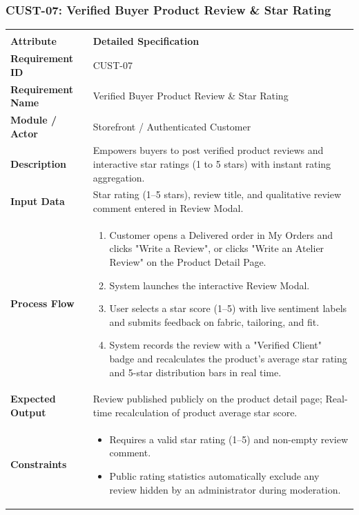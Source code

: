 \documentclass[12pt,a4paper,oneside]{report}
\begin{document}
\subsubsection{CUST-07: Verified Buyer Product Review \& Star Rating}
\begin{longtable}{|p{3.6cm}|p{11.9cm}|}
\hline
\rowcolor{PrimaryBrown}
\multicolumn{2}{|p{15.5cm}|}{\textbf{\textcolor{white}{Functional Specification: CUST-07 -- Verified Buyer Product Review \& Star Rating}}} \\
\hline
\endfirsthead
\hline
\rowcolor{PrimaryBrown}
\multicolumn{2}{|p{15.5cm}|}{\textbf{\textcolor{white}{Functional Specification: CUST-07 (Continued)}}} \\
\hline
\textbf{Attribute} & \textbf{Detailed Specification} \\
\hline
\endhead
\hline
\endfoot
\textbf{Requirement ID} & CUST-07 \\
\hline
\textbf{Requirement Name} & Verified Buyer Product Review \& Star Rating \\
\hline
\textbf{Module / Actor} & Storefront / Authenticated Customer \\
\hline
\textbf{Description} & Empowers buyers to post verified product reviews and interactive star ratings (1 to 5 stars) with instant rating aggregation. \\
\hline
\textbf{Input Data} & Star rating (1--5 stars), review title, and qualitative review comment entered in Review Modal. \\
\hline
\textbf{Process Flow} & \begin{enumerate}[leftmargin=*,nosep,topsep=2pt]
  \item Customer opens a Delivered order in My Orders and clicks "Write a Review", or clicks "Write an Atelier Review" on the Product Detail Page.
  \item System launches the interactive Review Modal.
  \item User selects a star score (1--5) with live sentiment labels and submits feedback on fabric, tailoring, and fit.
  \item System records the review with a "Verified Client" badge and recalculates the product's average star rating and 5-star distribution bars in real time.
\end{enumerate} \\
\hline
\textbf{Expected Output} & Review published publicly on the product detail page; Real-time recalculation of product average star score. \\
\hline
\textbf{Constraints} & \begin{itemize}[leftmargin=*,nosep,topsep=2pt]
  \item Requires a valid star rating (1--5) and non-empty review comment.
  \item Public rating statistics automatically exclude any review hidden by an administrator during moderation.
\end{itemize} \\
\hline
\end{longtable}
\end{document}
